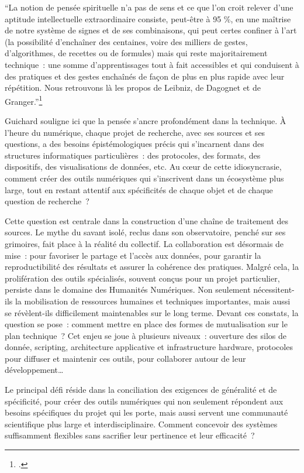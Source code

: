 \begin{kwote}
``La notion de pensée spirituelle n’a pas de sens et ce que l’on croit relever d’une aptitude intellectuelle extraordinaire consiste, peut-être à 95 \%, en une maîtrise de notre système de signes et de ses combinaisons, qui peut certes confiner à l’art (la possibilité d’enchaîner des centaines, voire des milliers de gestes, d’algorithmes, de recettes ou de formules) mais qui reste majoritairement technique~: une somme d’apprentissages tout à fait accessibles et qui conduisent à des pratiques et des gestes enchaînés de façon de plus en plus rapide avec leur répétition. Nous retrouvons là les propos de Leibniz, de Dagognet et de Granger.''\footcite{guichard_linternet_2014}
\end{kwote}

Guichard souligne ici que la pensée s'ancre profondément dans la technique. À l'heure du numérique, chaque projet de recherche, avec ses sources et ses questions, a des besoins épistémologiques précis qui s’incarnent dans des structures informatiques particulières~: des protocoles, des formats, des dispositifs, des visualisations de données, etc. Au cœur de cette idiosyncrasie, comment créer des outils numériques qui s'inscrivent dans un écosystème plus large, tout en restant attentif aux spécificités de chaque objet et de chaque question de recherche~?

Cette question est centrale dans la construction d'une chaîne de traitement des sources. Le mythe du savant isolé, reclus dans son observatoire, penché sur ses grimoires, fait place à la réalité du collectif. La collaboration est désormais de mise~: pour favoriser le partage et l'accès aux données, pour garantir la reproductibilité des résultats et assurer la cohérence des pratiques. Malgré cela, la prolifération des outils spécialisés, souvent conçus pour un projet particulier, persiste dans le domaine des Humanités Numériques. Non seulement nécessitent-ils la mobilisation de ressources humaines et techniques importantes, mais aussi se révèlent-ils difficilement maintenables sur le long terme. Devant ces constats, la question se pose~: comment mettre en place des formes de mutualisation sur le plan technique~? Cet enjeu se joue à plusieurs niveaux~: ouverture des silos de donnée, scripting, architecture applicative et infrastructure hardware, protocoles pour diffuser et maintenir ces outils, pour collaborer autour de leur développement\ldots

Le principal défi réside dans la conciliation des exigences de généralité et de spécificité, pour créer des outils numériques qui non seulement répondent aux besoins spécifiques du projet qui les porte, mais aussi servent une communauté scientifique plus large et interdisciplinaire. Comment concevoir des systèmes suffisamment flexibles sans sacrifier leur pertinence et leur efficacité~? 

